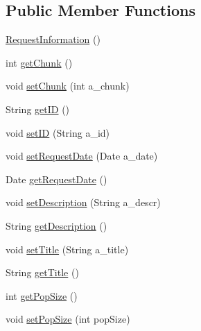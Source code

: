 \subsection*{Public Member Functions}
\begin{DoxyCompactItemize}
\item 
\hyperlink{classorg_1_1jgap_1_1distr_1_1grid_1_1wan_1_1_request_information_a66771ae91da907d0a0a1b86eb1528173}{Request\-Information} ()
\item 
int \hyperlink{classorg_1_1jgap_1_1distr_1_1grid_1_1wan_1_1_request_information_a69f76b403b88ca7f8b24dd896c44de65}{get\-Chunk} ()
\item 
void \hyperlink{classorg_1_1jgap_1_1distr_1_1grid_1_1wan_1_1_request_information_a1103fe42288b8f6950fb6f1960946abd}{set\-Chunk} (int a\-\_\-chunk)
\item 
String \hyperlink{classorg_1_1jgap_1_1distr_1_1grid_1_1wan_1_1_request_information_a2a2aeb36cf06cfbd108d84ba98f7f7ed}{get\-I\-D} ()
\item 
void \hyperlink{classorg_1_1jgap_1_1distr_1_1grid_1_1wan_1_1_request_information_a657a3a7ba1d093e6ae57965d7d5d03f7}{set\-I\-D} (String a\-\_\-id)
\item 
void \hyperlink{classorg_1_1jgap_1_1distr_1_1grid_1_1wan_1_1_request_information_ac614d72b9b705e08f6a68f773b1ca37f}{set\-Request\-Date} (Date a\-\_\-date)
\item 
Date \hyperlink{classorg_1_1jgap_1_1distr_1_1grid_1_1wan_1_1_request_information_a46201b14f81c70a8e66fdfe3c37f8ee1}{get\-Request\-Date} ()
\item 
void \hyperlink{classorg_1_1jgap_1_1distr_1_1grid_1_1wan_1_1_request_information_a9889e3cadef720c8527f8780efeb5944}{set\-Description} (String a\-\_\-descr)
\item 
String \hyperlink{classorg_1_1jgap_1_1distr_1_1grid_1_1wan_1_1_request_information_afba079bb7905526b408941d85e7b0d61}{get\-Description} ()
\item 
void \hyperlink{classorg_1_1jgap_1_1distr_1_1grid_1_1wan_1_1_request_information_af44be698ab61b72dd42024b334c52482}{set\-Title} (String a\-\_\-title)
\item 
String \hyperlink{classorg_1_1jgap_1_1distr_1_1grid_1_1wan_1_1_request_information_a501f7c49366261f6b31fa16092dac31d}{get\-Title} ()
\item 
int \hyperlink{classorg_1_1jgap_1_1distr_1_1grid_1_1wan_1_1_request_information_a9cf0aae2cfe6cdca09d0ff8a716b6eff}{get\-Pop\-Size} ()
\item 
void \hyperlink{classorg_1_1jgap_1_1distr_1_1grid_1_1wan_1_1_request_information_a042a778f84c168f7344c7d26c1f71ce3}{set\-Pop\-Size} (int pop\-Size)
\end{DoxyCompactItemize}
